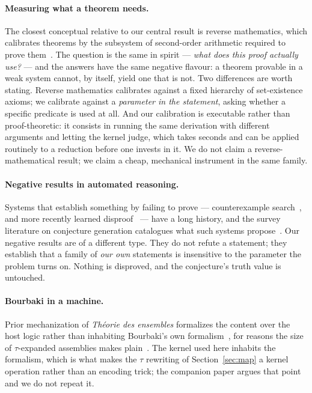 \documentclass[11pt]{article}
\theoremstyle{remark}\newtheorem{remark}{Remark}
\begin{document}
\paragraph{Measuring what a theorem needs.} The closest conceptual relative to our
central result is reverse mathematics, which calibrates theorems by the subsystem of
second-order arithmetic required to prove them~\cite{simpson2009sosoa}. The question is
the same in spirit --- \emph{what does this proof actually use?} --- and the answers have
the same negative flavour: a theorem provable in a weak system cannot, by itself, yield
one that is not. Two differences are worth stating. Reverse mathematics calibrates
against a fixed hierarchy of set-existence axioms; we calibrate against a
\emph{parameter in the statement}, asking whether a specific predicate is used at all.
And our calibration is executable rather than proof-theoretic: it consists in running
the same derivation with different arguments and letting the kernel judge, which takes
seconds and can be applied routinely to a reduction before one invests in it. We do not
claim a reverse-mathematical result; we claim a cheap, mechanical instrument in the same
family.

\paragraph{Negative results in automated reasoning.} Systems that establish something by
failing to prove --- counterexample search~\cite{blanchette2011nitpick}, and more
recently learned disproof~\cite{learningtodisprove2026} --- have a long history, and the
survey literature on conjecture generation catalogues what such systems
propose~\cite{conjecturingsurvey2026}. Our negative results are of a different type.
They do not refute a statement; they establish that a family of \emph{our own}
statements is insensitive to the parameter the problem turns on. Nothing is disproved,
and the conjecture's truth value is untouched.

\paragraph{Bourbaki in a machine.} Prior mechanization of \emph{Th\'eorie des ensembles}
formalizes the content over the host logic rather than inhabiting Bourbaki's own
formalism~\cite{grimm2010gaia}, for reasons the size of $\tau$-expanded assemblies makes
plain~\cite{mathias2002term}. The kernel used here inhabits the formalism, which is what
makes the $\tau$ rewriting of Section~\ref{sec:map} a kernel operation rather than an
encoding trick; the companion paper argues that point and we do not repeat it.
\end{document}
